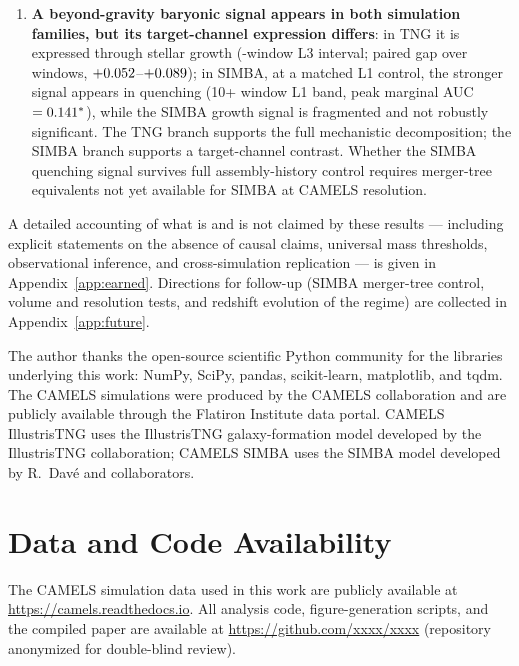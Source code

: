 \documentclass[twocolumn,linenumbers]{aastex701}
\begin{document}
\begin{enumerate}
  \item \textbf{A beyond-gravity baryonic signal appears in both simulation
    families, but its target-channel expression differs}: in TNG it is
    expressed through stellar growth (\WindowNWindowsL{}-window L3 interval;
    paired gap over \PairedGapNWindows{} windows,
    $+0.052$--$+0.089$); in SIMBA, at a matched L1 control, the
    stronger signal appears in quenching (10+ window L1 band, peak marginal AUC
    $= 0.141^*$), while the SIMBA growth signal is fragmented and
    not robustly significant.
    The TNG branch supports the full mechanistic decomposition; the SIMBA
    branch supports a target-channel contrast.
    Whether the SIMBA quenching signal survives full assembly-history
    control requires merger-tree equivalents not yet available for SIMBA at
    CAMELS resolution.
\end{enumerate}

A detailed accounting of what is and is not claimed by these results ---
including explicit statements on the absence of causal claims, universal
mass thresholds, observational inference, and cross-simulation replication
--- is given in Appendix~\ref{app:earned}.
Directions for follow-up (SIMBA merger-tree control, volume and resolution
tests, and redshift evolution of the regime) are collected in
Appendix~\ref{app:future}.

\begin{acknowledgments}
The author thanks the open-source scientific Python community for the
libraries underlying this work: NumPy, SciPy, pandas, scikit-learn,
matplotlib, and tqdm.
The CAMELS simulations were produced by the CAMELS collaboration and are
publicly available through the Flatiron Institute data portal.
CAMELS IllustrisTNG uses the IllustrisTNG galaxy-formation model developed
by the IllustrisTNG collaboration; CAMELS SIMBA uses the SIMBA model
developed by R.\ Dav\'{e} and collaborators.
\end{acknowledgments}

\section*{Data and Code Availability}

The CAMELS simulation data used in this work are publicly available at
\url{https://camels.readthedocs.io}.
All analysis code, figure-generation scripts, and the compiled paper are
available at \url{https://github.com/xxxx/xxxx} (repository anonymized for
double-blind review).
\end{document}
